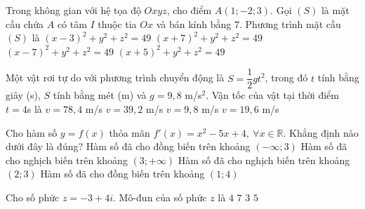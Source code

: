 \begin{ex}%
	Trong không gian với hệ tọa độ $Oxyz$, cho điểm $A(1;-2;3)$. Gọi $(S)$ là mặt cầu chứa $A$ có tâm $I$ thuộc tia $Ox$ và bán kính bằng $7$. Phương trình mặt cầu $(S)$ là	
	\choice
	{$(x-3)^2+y^2+z^2=49$}
	{$(x+7)^2+y^2+z^2=49$}
	{\True $(x-7)^2+y^2+z^2=49$}
	{$(x+5)^2+y^2+z^2=49$}
\end{ex}
\begin{ex}%
	Một vật rơi tự do với phương trình chuyển động là $S=\dfrac{1}{2}gt^2$, trong đó $t$ tính bằng giây (s), $S$ tính bằng mét (m) và $g=9{,}8$ m/s$^2$. Vận tốc của vật tại thời điểm $t=4$s là	
	\choice
	{$v=78{,}4$ m/s}
	{\True $v=39{,}2$ m/s}
	{$v=9{,}8$ m/s}
	{$v=19{,}6$ m/s}
\end{ex}
\begin{ex}%
	Cho hàm số $y=f(x)$ thỏa mãn $f'(x)=x^2-5x+4,\ \forall x\in \mathbb{R}$. Khẳng định nào dưới đây là đúng?	
	\choice
	{Hàm số đã cho đồng biến trên khoảng $(-\infty;3)$}
	{Hàm số đã cho nghịch biến trên khoảng $(3;+\infty)$}
	{\True Hàm số đã cho nghịch biến trên khoảng $(2;3)$}
	{Hàm số đã cho đồng biến trên khoảng $(1;4)$}
\end{ex}
\begin{ex}%
	Cho số phức $z=-3+4i$. Mô-đun của số phức $z$ là	
	\choice
	{$4$}
	{$7$}
	{$3$}
	{\True $5$}
\end{ex}
